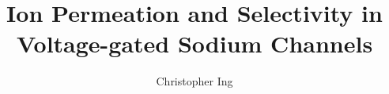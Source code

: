 \documentclass[doublespaced]{ut-thesis}
\author{Christopher Ing}
\title{Ion Permeation and Selectivity in Voltage-gated Sodium Channels}
\begin{document}
\begin{preliminary}

\maketitle

\cleardoublepage
\newpage

\begin{abstract}



\end{abstract}
\end{preliminary}
\end{document}
